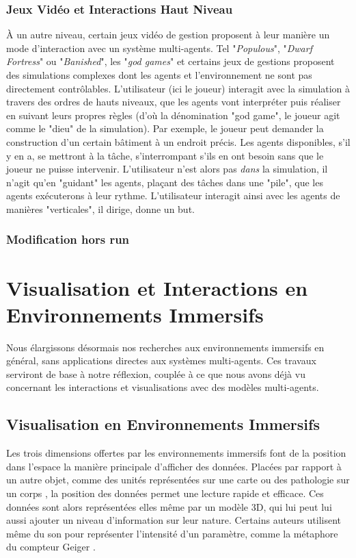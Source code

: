 		
	\subsubsection{Jeux Vidéo et Interactions Haut Niveau}		
		À un autre niveau, certain jeux vidéo de gestion proposent à leur manière un mode d'interaction avec un système multi-agents. Tel "\textit{Populous}", "\textit{Dwarf Fortress}" ou "\textit{Banished}", les "\textit{god games}" et certains jeux de gestions proposent des simulations complexes dont les agents et l'environnement ne sont pas directement contrôlables. L'utilisateur (ici le joueur) interagit avec la simulation à travers des ordres de hauts niveaux, que les agents vont interpréter puis réaliser en suivant leurs propres règles (d'où la dénomination "god game", le joueur agit comme le "dieu" de la simulation). Par exemple, le joueur peut demander la construction d'un certain bâtiment à un endroit précis. Les agents disponibles, s'il y en a, se mettront à la tâche, s'interrompant s'ils en ont besoin sans que le joueur ne puisse intervenir. L'utilisateur n'est alors pas \textit{dans} la simulation, il n'agit qu'en "guidant" les agents, plaçant des tâches dans une "pile", que les agents exécuterons à leur rythme. L'utilisateur interagit ainsi avec les agents de manières "verticales", il dirige, donne un but.
		
		\subsubsection{Modification hors run}
	
	
	\section{Visualisation et Interactions en Environnements Immersifs}	
	
	Nous élargissons désormais nos recherches aux environnements immersifs en général, sans applications directes aux systèmes multi-agents. Ces travaux serviront de base à notre réflexion, couplée à ce que nous avons déjà vu concernant les interactions et visualisations avec des modèles multi-agents.
	
	\subsection{Visualisation en Environnements Immersifs}
	
	Les trois dimensions offertes par les environnements immersifs font de la position dans l'espace la manière principale d'afficher des données. Placées par rapport à un autre objet, comme des unités représentées sur une carte \cite{durbin_battlefield_1998} ou des pathologie sur un corps \cite{coffey_interactive_2012}, la position des données permet une lecture rapide et efficace. Ces données sont alors représentées elles même par un modèle 3D, qui lui peut lui aussi ajouter un niveau d'information sur leur nature. Certains auteurs utilisent même du son pour représenter l'intensité d'un paramètre, comme la métaphore du compteur Geiger \cite{frohlich_exploring_1999}.
	
